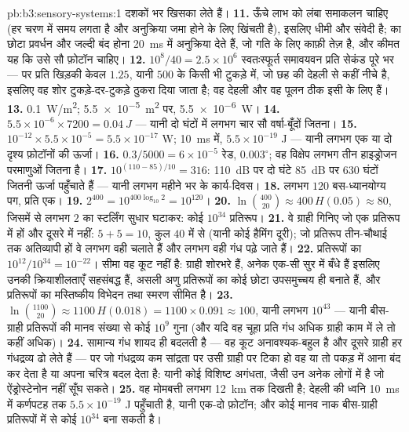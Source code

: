 \begin{solution}{pb:b3:sensory-systems:1}
दशकों भर खिसका लेते हैं।
\textbf{11.} ऊँचे लाभ को लंबा समाकलन चाहिए (हर चरण में समय लगता है और
अनुक्रिया जमा होने के लिए खिंचती है), इसलिए  धीमी और संवेदी है;
 का छोटा प्रवर्धन और जल्दी बंद होना \qty{20}{ms} में अनुक्रिया देते
हैं, जो गति के लिए काफ़ी तेज़ है, और कीमत यह कि उसे सौ फ़ोटॉन चाहिए।
\textbf{12.} $10^{8}/40 = 2.5\times 10^{6}$ स्वतःस्फूर्त समावयवन प्रति
सेकंड पूरे  भर --- पर प्रति खिड़की केवल $1.25$, यानी
$500$  के किसी भी टुकड़े में, जो छह की देहली से कहीं नीचे है, इसलिए वह शोर
टुकड़े-दर-टुकड़े ठुकरा दिया जाता है; वह देहली और वह पूलन ठीक इसी के
लिए हैं।
\textbf{13.} \qty{0.1}{W/m^2}; \qty{5.5e-5}{m^2} पर, \qty{5.5e-6}{W}।
\textbf{14.} $5.5\times 10^{-6}\times 7200 = \qty{0.04}{J}$ --- यानी दो
घंटों में लगभग चार सौ वर्षा-बूँदों जितना।
\textbf{15.} $10^{-12}\times 5.5\times 10^{-5} = 5.5\times 10^{-17}$ W;
\qty{10}{ms} में, $5.5\times 10^{-19}$ J --- यानी लगभग एक या दो दृश्य
फ़ोटॉनों की ऊर्जा।
\textbf{16.} $0.3/5000 = 6\times 10^{-5}$ रेड, $0.003^{\circ}$; वह
विक्षेप लगभग तीन हाइड्रोजन परमाणुओं जितना है।
\textbf{17.} $10^{(110 - 85)/10} = 316$: \qty{110}{dB} पर दो घंटे
\qty{85}{dB} पर $630$ घंटों जितनी ऊर्जा पहुँचाते हैं --- यानी लगभग
महीने भर के कार्य-दिवस।
\textbf{18.} लगभग $120$ बस-ध्यानयोग्य पग, प्रति  एक।
\textbf{19.} $2^{400} = 10^{400\log_{10}2} = 10^{120}$।
\textbf{20.} $\ln\binom{400}{20} \approx 400\,H(0.05) \approx 80$, जिसमें
से लगभग $2$ का स्टर्लिंग सुधार घटाकर: कोई $10^{34}$ प्रतिरूप।
\textbf{21.} वे ग्राही गिनिए जो एक प्रतिरूप में हों और दूसरे में नहीं: $5 +
5 = 10$, कुल $40$ में से (यानी कोई हैमिंग दूरी); जो प्रतिरूप तीन-चौथाई तक अतिव्यापी हों
वे लगभग वही  चलाते हैं और लगभग वही गंध पढ़े जाते हैं।
\textbf{22.} प्रतिरूपों का $10^{12}/10^{34} = 10^{-22}$। सीमा वह कूट
नहीं है: ग्राही शोरभरे हैं, अनेक एक-सी सुर में बँधे हैं इसलिए उनकी
क्रियाशीलताएँ सहसंबद्ध हैं, असली अणु प्रतिरूपों का कोई छोटा उपसमुच्चय
ही बनाते हैं, और प्रतिरूपों का मस्तिष्कीय विभेदन तथा स्मरण सीमित है।
\textbf{23.} $\ln\binom{1100}{20} \approx 1100\,H(0.018) = 1100\times
0.091 \approx 100$, यानी लगभग $10^{43}$ --- यानी बीस-ग्राही प्रतिरूपों
की मानव संख्या से कोई $10^{9}$ गुना (और यदि वह चूहा प्रति गंध अधिक
ग्राही काम में ले तो कहीं अधिक)।
\textbf{24.} सामान्य गंध शायद ही बदलती है --- वह कूट अनावश्यक-बहुल है
और दूसरे ग्राही हर गंधद्रव्य ढो लेते हैं --- पर जो गंधद्रव्य कम
सांद्रता पर उसी ग्राही पर टिका हो वह या तो पकड़ में आना बंद कर देता है
या अपना चरित्र बदल देता है: यानी कोई विशिष्ट अगंधता, जैसी उन अनेक लोगों
में है जो ऐंड्रोस्टेनोन नहीं सूँघ सकते।
\textbf{25.} वह मोमबत्ती लगभग \qty{12}{km} तक दिखती है; देहली की ध्वनि
\qty{10}{ms} में कर्णपटह तक $5.5\times 10^{-19}$ J पहुँचाती है, यानी
एक-दो फ़ोटॉन; और कोई मानव नाक बीस-ग्राही प्रतिरूपों में से कोई
$10^{34}$ बना सकती है।
\end{solution}
